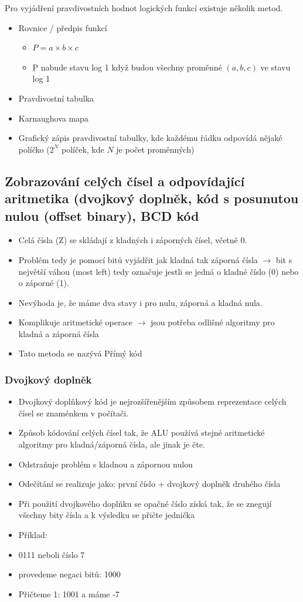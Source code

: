 \documentclass[10pt,a4paper]{article}
\begin{document}
Pro vyjádření pravdivostních hodnot logických funkcí existuje několik metod.


\begin{itemize}
\item Rovnice / předpis funkcí
\begin{itemize}
\item $P = a \times b \times c$
\item P nabude stavu log 1 když budou všechny proměnné $(a,b,c)$ ve stavu log 1
\end{itemize}
\item Pravdivostní tabulka
\item Karnaughova mapa
\item Grafický zápis pravdivostní tabulky, kde každému řádku odpovídá nějaké políčko ($2^N$ políček, kde $N$ je počet proměnných)
\end{itemize}


\subsection{Zobrazování celých čísel a odpovídající aritmetika (dvojkový doplněk, kód s posunutou nulou (offset binary), BCD kód}
\begin{itemize}
\item Celá čísla (Z) se skládají z kladných i záporných čísel, včetně 0.
\item Problém tedy je pomocí bitů vyjádřit jak kladná tak záporná čísla $\rightarrow$ bit s největší váhou (most left) tedy označuje jestli se jedná o kladné číslo (0) nebo o záporné (1).
\item Nevýhoda je, že máme dva stavy i pro nulu, záporná a kladná nula.
\item Komplikuje aritmetické operace $\rightarrow$ jsou potřeba odlišné algoritmy pro kladná a záporná čísla
\item Tato metoda se nazývá Přímý kód
\end{itemize}

\subsubsection{Dvojkový doplněk}
\begin{itemize}
\item Dvojkový doplňkový kód je nejrozšířenějším způsobem reprezentace celých čísel se znaménkem v počítači.
\item Způsob kódování celých čísel tak, že ALU používá stejné aritmetické algoritmy pro kladná/záporná čísla, ale jinak je čte.
\item Odstraňuje problém s kladnou a zápornou nulou
\item Odečítání se realizuje jako: první číslo + dvojkový doplněk druhého čísla
\item Při použití dvojkového doplňku se opačné číslo získá tak, že se znegují všechny bity čísla a k výsledku se přičte jednička
\item Příklad:
\item 0111 neboli číslo 7
\item provedeme negaci bitů: 1000
\item Přičteme 1: 1001 a máme -7
\end{itemize}
\end{document}
